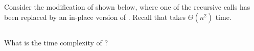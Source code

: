 \begin{prob}
    Consider the modification of  shown below, where one of the
    recursive calls has been replaced by an in-place version of
    . Recall that  takes $\Theta(n^2)$
    time.

    \inputminted{python}{\thisdir/code.py}

    What is the time complexity of ?

\end{prob}
